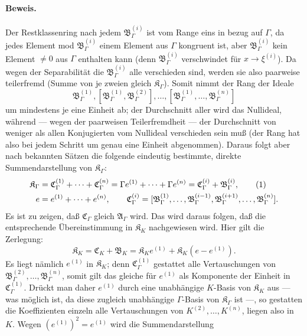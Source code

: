 \paragraph{Beweis.}
Der Restklassenring nach jedem $\mathfrak B_\Gamma^{(i)}$ ist vom Range eins in bezug auf $\Gamma$, da jedes Element mod $\mathfrak B_\Gamma^{(i)}$ einem Element aus $\Gamma$ kongruent ist, aber $\mathfrak B_\Gamma^{(i)}$ kein Element $\ne0$ aus $\Gamma$ enthalten kann (denn $\mathfrak B_\Gamma^{(i)}$ verschwindet für $x\to\xi^{(i)}$). Da wegen der Separabilität die $\mathfrak B_\Gamma^{(i)}$ alle verschieden sind, werden sie also paarweise teilerfremd (Summe von je zweien gleich $\mathfrak K_\Gamma$). Somit nimmt der Rang der Ideale
\[
\mathfrak B_\Gamma^{(1)},
[\mathfrak B_\Gamma^{(1)},\mathfrak B_\Gamma^{(2)}],\ldots,
[\mathfrak B_\Gamma^{(1)},\ldots,\mathfrak B_\Gamma^{(n)}]
\]
um mindestens je eine Einheit ab; der Durchschnitt aller wird das Nullideal, während --- wegen der paarweisen Teilerfremdheit --- der Durchschnitt von weniger als allen Konjugierten vom Nullideal verschieden sein muß (der Rang hat also bei jedem Schritt um genau eine Einheit abgenommen). Daraus folgt aber nach bekannten Sätzen die folgende eindeutig bestimmte, direkte Summendarstellung von $\mathfrak K_\Gamma$: 
\begin{align}
\mathfrak K_\Gamma
&=\mathfrak C_\Gamma^{(1)}+\cdots+\mathfrak C_\Gamma^{(n)}
=\Gamma e^{(1)}+\cdots+\Gamma e^{(n)}
=\mathfrak C_\Gamma^{(i)}+\mathfrak B_\Gamma^{(i)}, \tag{1}\\
e&=e^{(1)}+\cdots+e^{(n)},\qquad
\mathfrak C_\Gamma^{(i)}=
[\mathfrak B_\Gamma^{(1)},\ldots,\mathfrak B_\Gamma^{(i-1)},
\mathfrak B_\Gamma^{(i+1)},\ldots,\mathfrak B_\Gamma^{(n)}].\notag
\end{align}
Es ist zu zeigen, daß $\mathfrak C_\Gamma$ gleich $\mathfrak A_\Gamma$ wird. Das wird daraus folgen, daß die entsprechende Übereinstimmung in $\mathfrak K_K$ nachgewiesen wird. Hier gilt die Zerlegung:
\begin{equation}
\mathfrak K_K=\mathfrak C_K+\mathfrak B_K
=\mathfrak K_K e^{(1)}+\mathfrak K_K(e-e^{(1)}). \tag{2}
\end{equation}
Es liegt nämlich $e^{(1)}$ in $\mathfrak K_K$; denn $\mathfrak C_\Gamma^{(1)}$ gestattet alle Vertauschungen von $\mathfrak B_\Gamma^{(2)},\ldots,\mathfrak B_\Gamma^{(n)}$, somit gilt das gleiche für $e^{(1)}$ als Komponente der Einheit in $\mathfrak C_\Gamma^{(1)}$. Drückt man daher $e^{(1)}$ durch eine unabhängige $K$-Basis von $\mathfrak K_K$ aus --- was möglich ist, da diese zugleich unabhängige $\Gamma$-Basis von $\mathfrak K_\Gamma$ ist ---, so gestatten die Koeffizienten einzeln alle Vertauschungen von $K^{(2)},\ldots,K^{(n)}$, liegen also in $K$. Wegen $(e^{(1)})^2=e^{(1)}$ wird die Summendarstellung
